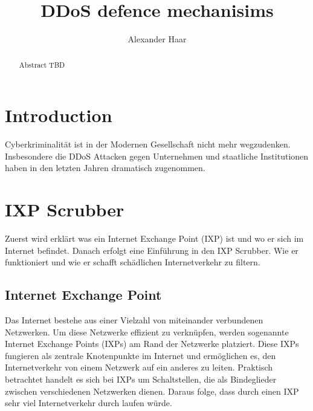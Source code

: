 \documentclass[sigplan,screen]{acmart}
\begin{document}
\title{DDoS defence mechanisims }

\author{Alexander Haar}

\begin{abstract}
  Abstract TBD
\end{abstract}



\maketitle

\section{Introduction}
Cyberkriminalität ist in der Modernen Gesellschaft nicht mehr wegzudenken. Insbesondere die DDoS Attacken gegen Unternehmen und staatliche Institutionen haben in den letzten Jahren dramatisch zugenommen.

\section{IXP Scrubber}
Zuerst wird erklärt was ein Internet Exchange Point (IXP) ist und wo er sich im Internet befindet. Danach erfolgt eine Einführung in den IXP Scrubber. Wie er funktioniert und wie er schafft schädlichen Internetverkehr zu filtern.

\subsection{Internet Exchange Point}
Das Internet bestehe aus einer Vielzahl von miteinander verbundenen Netzwerken. Um diese Netzwerke effizient zu verknüpfen, werden sogenannte Internet Exchange Points (IXPs) am Rand der Netzwerke platziert. Diese IXPs fungieren als zentrale Knotenpunkte im Internet und ermöglichen es, den Internetverkehr von einem Netzwerk auf ein anderes zu leiten. Praktisch betrachtet handelt es sich bei IXPs um Schaltstellen, die als Bindeglieder zwischen verschiedenen Netzwerken dienen. Daraus folge, dass durch einen IXP sehr viel Internetverkehr durch laufen würde.
\end{document}
